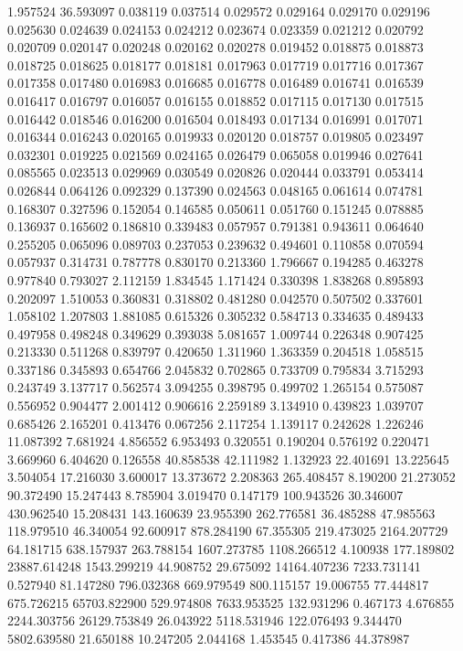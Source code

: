 1.957524
36.593097
0.038119
0.037514
0.029572
0.029164
0.029170
0.029196
0.025630
0.024639
0.024153
0.024212
0.023674
0.023359
0.021212
0.020792
0.020709
0.020147
0.020248
0.020162
0.020278
0.019452
0.018875
0.018873
0.018725
0.018625
0.018177
0.018181
0.017963
0.017719
0.017716
0.017367
0.017358
0.017480
0.016983
0.016685
0.016778
0.016489
0.016741
0.016539
0.016417
0.016797
0.016057
0.016155
0.018852
0.017115
0.017130
0.017515
0.016442
0.018546
0.016200
0.016504
0.018493
0.017134
0.016991
0.017071
0.016344
0.016243
0.020165
0.019933
0.020120
0.018757
0.019805
0.023497
0.032301
0.019225
0.021569
0.024165
0.026479
0.065058
0.019946
0.027641
0.085565
0.023513
0.029969
0.030549
0.020826
0.020444
0.033791
0.053414
0.026844
0.064126
0.092329
0.137390
0.024563
0.048165
0.061614
0.074781
0.168307
0.327596
0.152054
0.146585
0.050611
0.051760
0.151245
0.078885
0.136937
0.165602
0.186810
0.339483
0.057957
0.791381
0.943611
0.064640
0.255205
0.065096
0.089703
0.237053
0.239632
0.494601
0.110858
0.070594
0.057937
0.314731
0.787778
0.830170
0.213360
1.796667
0.194285
0.463278
0.977840
0.793027
2.112159
1.834545
1.171424
0.330398
1.838268
0.895893
0.202097
1.510053
0.360831
0.318802
0.481280
0.042570
0.507502
0.337601
1.058102
1.207803
1.881085
0.615326
0.305232
0.584713
0.334635
0.489433
0.497958
0.498248
0.349629
0.393038
5.081657
1.009744
0.226348
0.907425
0.213330
0.511268
0.839797
0.420650
1.311960
1.363359
0.204518
1.058515
0.337186
0.345893
0.654766
2.045832
0.702865
0.733709
0.795834
3.715293
0.243749
3.137717
0.562574
3.094255
0.398795
0.499702
1.265154
0.575087
0.556952
0.904477
2.001412
0.906616
2.259189
3.134910
0.439823
1.039707
0.685426
2.165201
0.413476
0.067256
2.117254
1.139117
0.242628
1.226246
11.087392
7.681924
4.856552
6.953493
0.320551
0.190204
0.576192
0.220471
3.669960
6.404620
0.126558
40.858538
42.111982
1.132923
22.401691
13.225645
3.504054
17.216030
3.600017
13.373672
2.208363
265.408457
8.190200
21.273052
90.372490
15.247443
8.785904
3.019470
0.147179
100.943526
30.346007
430.962540
15.208431
143.160639
23.955390
262.776581
36.485288
47.985563
118.979510
46.340054
92.600917
878.284190
67.355305
219.473025
2164.207729
64.181715
638.157937
263.788154
1607.273785
1108.266512
4.100938
177.189802
23887.614248
1543.299219
44.908752
29.675092
14164.407236
7233.731141
0.527940
81.147280
796.032368
669.979549
800.115157
19.006755
77.444817
675.726215
65703.822900
529.974808
7633.953525
132.931296
0.467173
4.676855
2244.303756
26129.753849
26.043922
5118.531946
122.076493
9.344470
5802.639580
21.650188
10.247205
2.044168
1.453545
0.417386
44.378987
